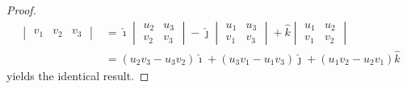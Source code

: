 \begin{proof}
\begin{align*}
\begin{vmatrix}
v_1 & v_2 & v_3
\end{vmatrix} 
&= 
\hat{\imath}
\begin{vmatrix}
u_2 & u_3 \\
v_2 & v_3
\end{vmatrix} 
- \hat{\jmath}
\begin{vmatrix}
u_1 & u_3 \\
v_1 & v_3
\end{vmatrix} 
+ \hat{k}
\begin{vmatrix}
u_1 & u_2 \\
v_1 & v_2
\end{vmatrix} \\
&= (u_2v_3 - u_3v_2)\hat{\imath} + (u_3v_1 - u_1v_3)\hat{\jmath} + (u_1v_2 - u_2v_1)\hat{k}
\end{align*}
yields the identical result.
\end{proof}

